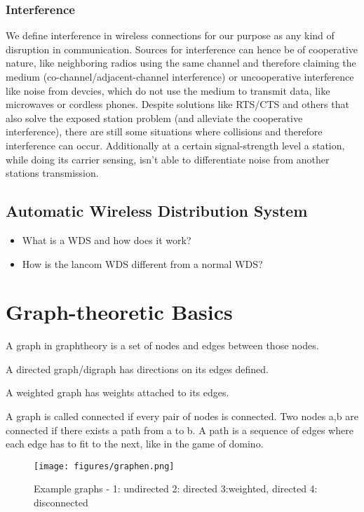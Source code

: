       \subsubsection{Interference}
	We define interference in wireless connections for our purpose as any kind of disruption in communication. Sources for interference can hence be
	of cooperative nature, like neighboring radios using the same channel and therefore claiming the medium (co-channel/adjacent-channel interference)
	or uncooperative interference like noise from devcies, which do not use the medium to transmit data, like microwaves or cordless phones.
	Despite solutions like RTS/CTS and others that also solve the exposed station problem (and alleviate the cooperative interference),
	there are still some situations where collisions and therefore interference can occur.
	Additionally at a certain signal-strength level a station, while doing its carrier sensing, isn't able to differentiate noise from another stations transmission.
	      
    \subsection{Automatic Wireless Distribution System}
      \begin{itemize}
       \item What is a WDS and how does it work?
       \item How is the lancom WDS different from a normal WDS?
      \end{itemize}
      
\section{Graph-theoretic Basics}
  A graph in graphtheory is a set of nodes and edges between those nodes. 
  
  A directed graph/digraph has directions on its edges defined.
  
  A weighted graph has weights attached to its edges.
  
  A graph is called connected if every pair of nodes is connected. 
  Two nodes a,b are connected if there exists a path from a to b.
  A path is a sequence of edges where each edge has to fit to the next, like in the game of domino.
  
  \begin{figure}[th!]
    \centering
    \texttt{[image: figures/graphen.png]}
    \caption{Example graphs - 1: undirected 2: directed 3:weighted, directed 4: disconnected}
    \label{fig:graphen}
  \end{figure}

